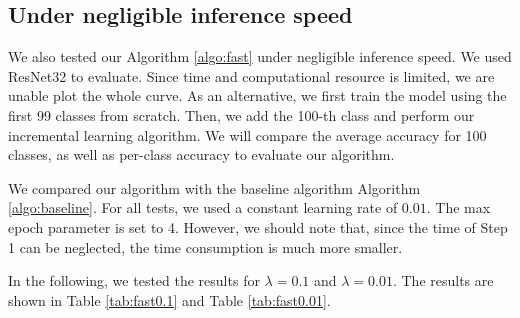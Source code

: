 \subsection{Under negligible inference speed}
We also tested our Algorithm \ref{algo:fast} under negligible inference speed. We used ResNet32 to evaluate. Since time and computational resource is limited, we are unable plot the whole curve. As an alternative, we first train the model using the first 99 classes from scratch. Then, we add the 100-th class and perform our incremental learning algorithm. We will compare the average accuracy for 100 classes, as well as per-class accuracy to evaluate our algorithm.

We compared our algorithm with the baseline algorithm Algorithm \ref{algo:baseline}. For all tests, we used a constant learning rate of $0.01$. The max epoch parameter is set to 4. However, we should note that, since the time of Step 1 can be neglected, the time consumption is much more smaller. 

In the following, we tested the results for $\lambda=0.1$ and $\lambda=0.01$. The results are shown in Table \ref{tab:fast0.1} and Table \ref{tab:fast0.01}.

